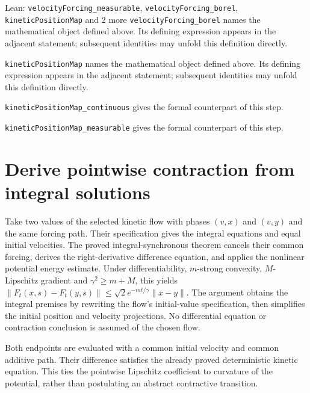 \documentclass[11pt,a4paper]{article}
\begin{document}
\begin{leanbox}{Lean: \texttt{velocityForcing\_\allowbreak{}measurable}, \texttt{velocityForcing\_\allowbreak{}borel}, \texttt{kineticPositionMap} and 2 more}
\texttt{velocity\allowbreak{}Forcing\_\allowbreak{}borel} names the mathematical object defined above. Its defining expression appears in the adjacent statement; subsequent identities may unfold this definition directly.




\texttt{kinetic\allowbreak{}Position\allowbreak{}Map} names the mathematical object defined above. Its defining expression appears in the adjacent statement; subsequent identities may unfold this definition directly.




\texttt{kinetic\allowbreak{}Position\allowbreak{}Map\_\allowbreak{}continuous} gives the formal counterpart of this step.




\texttt{kinetic\allowbreak{}Position\allowbreak{}Map\_\allowbreak{}measurable} gives the formal counterpart of this step.
\end{leanbox}

\section{\texorpdfstring{Derive pointwise contraction from integral solutions}{Derive pointwise contraction from integral solutions}}


Take two values of the selected kinetic flow with phases \((v,x)\) and \((v,y)\) and the same forcing path. Their specification gives the integral equations and equal initial velocities. The proved integral-synchronous theorem cancels their common forcing, derives the right-derivative difference equation, and applies the nonlinear potential energy estimate. Under differentiability, \(m\)-strong convexity, \(M\)-Lipschitz gradient and \(\gamma^2\ge m+M\), this yields \(\|F_t(x,s)-F_t(y,s)\|\le\sqrt2e^{-mt/\gamma}\|x-y\|\). The argument obtains the integral premises by rewriting the flow's initial-value specification, then simplifies the initial position and velocity projections. No differential equation or contraction conclusion is assumed of the chosen flow.



Both endpoints are evaluated with a common initial velocity and common additive path. Their difference satisfies the already proved deterministic kinetic equation. This ties the pointwise Lipschitz coefficient to curvature of the potential, rather than postulating an abstract contractive transition.
\end{document}
